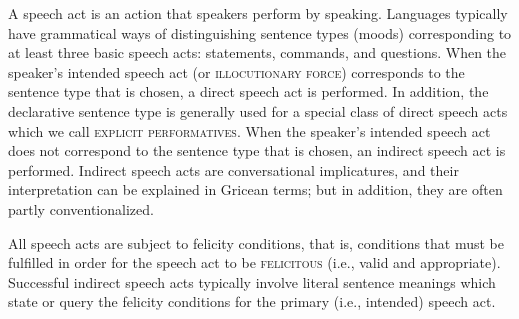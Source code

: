 A speech act is an action that speakers perform by speaking. Languages typically have grammatical ways of distinguishing sentence types (moods) corresponding to at least three basic speech acts: statements, commands, and questions. When the speaker’s intended speech act (or \textsc{illocutionary force}) corresponds to the sentence type that is chosen, a direct speech act is performed. In addition, the declarative sentence type is generally used for a special class of direct speech acts which we call \textsc{explicit performatives}. When the speaker’s intended speech act does not correspond to the sentence type that is chosen, an indirect speech act is performed. Indirect speech acts are conversational implicatures, and their interpretation can be explained in Gricean terms; but in addition, they are often partly conventionalized.



All speech acts are subject to felicity conditions, that is, conditions that must be fulfilled in order for the speech act to be \textsc{felicitous} (i.e., valid and appropriate). Successful indirect speech acts typically involve literal sentence meanings which state or query the felicity conditions for the primary (i.e., intended) speech act.



